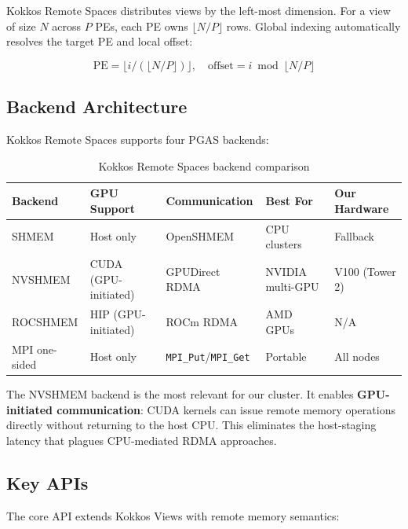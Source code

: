 \documentclass[11pt,letterpaper]{article}
\begin{document}
Kokkos Remote Spaces distributes views by the left-most dimension. For a view of size $N$ across $P$ PEs, each PE owns $\lfloor N/P \rfloor$ rows. Global indexing automatically resolves the target PE and local offset:

\begin{equation}
    \text{PE} = \lfloor i / (\lfloor N/P \rfloor) \rfloor, \quad \text{offset} = i \bmod \lfloor N/P \rfloor
    \label{eq:pgas-mapping}
\end{equation}

\subsection{Backend Architecture}

Kokkos Remote Spaces supports four PGAS backends:

\begin{table}[htbp]
\centering
\caption{Kokkos Remote Spaces backend comparison}
\label{tab:backends}
\begin{tabular}{@{}lllll@{}}
\toprule
\textbf{Backend} & \textbf{GPU Support} & \textbf{Communication} & \textbf{Best For} & \textbf{Our Hardware} \\
\midrule
SHMEM & Host only & OpenSHMEM & CPU clusters & Fallback \\
NVSHMEM & CUDA (GPU-initiated) & GPUDirect RDMA & NVIDIA multi-GPU & V100 (Tower 2) \\
ROCSHMEM & HIP (GPU-initiated) & ROCm RDMA & AMD GPUs & N/A \\
MPI one-sided & Host only & \texttt{MPI\_Put}/\texttt{MPI\_Get} & Portable & All nodes \\
\bottomrule
\end{tabular}
\end{table}

The NVSHMEM backend is the most relevant for our cluster. It enables \textbf{GPU-initiated communication}: CUDA kernels can issue remote memory operations directly without returning to the host CPU. This eliminates the host-staging latency that plagues CPU-mediated RDMA approaches.

\subsection{Key APIs}

The core API extends Kokkos Views with remote memory semantics:
\end{document}
